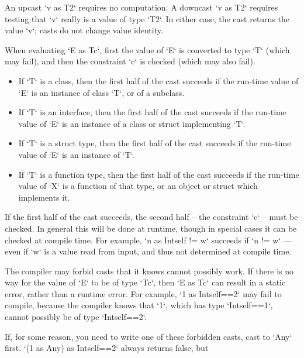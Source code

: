 An upcast \xcd`v as T2` requires no computation.  
A downcast \xcd`v as T2` requires testing that \xcd`v` really is a value of
type \xcd`T2`.  In either case, the cast returns the value \xcd`v`; casts do
not change value identity.


When evaluating \xcd`E as T{c}`, first the value of \xcd`E` is converted to
type \xcd`T` (which may fail), and then the constraint \xcd`{c}` is checked
(which may also fail). 



\begin{itemize}
      
\item If \xcd`T` is a class, then the first half of the cast succeeds if the
      run-time value of \xcd`E` is an instance of class \xcd`T`, or of a
      subclass. 

\item If \xcd`T` is an interface, then the first half of the cast succeeds if
      the run-time value of \xcd`E` is an instance of a class or struct
      implementing 
      \xcd`T`. 

\item If \xcd`T` is a struct type, then the first half of the cast succeeds if
      the run-time value of \xcd`E` is an instance of \xcd`T`.  

\item If \xcd`T` is a function type, then the first half of the cast succeeds
      if the run-time value of \xcd`X` is a function of that type, or an
      object or struct which implements it.
\end{itemize}

If the first half of the cast succeeds, the second half -- the constraint
\xcd`{c}` -- must be checked.  In general this will be done at runtime, though
in special cases it can be checked at compile time.   For example, 
\xcd`n as Int{self != w}` succeeds if \xcd`n != w` --- even if \xcd`w` is a value
read from input, and thus not determined at compile time.

The compiler may forbid casts that it knows cannot possibly work. If there is
no way for the value of \xcd`E` to be of type \xcd`T{c}`, then 
\xcd`E as T{c}` can result in a static error, rather than a runtime error.  
For example, \xcd`1 as Int{self==2}` may fail to compile, because the compiler
knows that \xcd`1`, which has type \xcd`Int{self==1}`, cannot possibly be of
type \xcd`Int{self==2}`. 

If, for some reason, you need to write one of these forbidden casts, cast to
\xcd`Any` first.  \xcd`(1 as Any) as Int{self==2}` always returns false, but 


